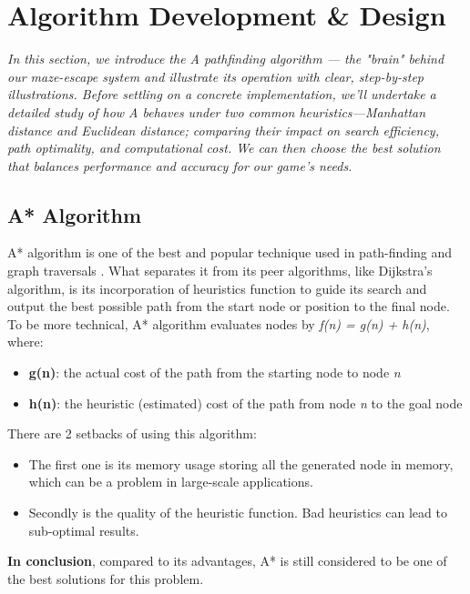 \documentclass[a4paper,12pt]{article}
\begin{document}
\newpage

\section{Algorithm Development \& Design}
\textit{In this section, we introduce the A\* pathfinding algorithm — the "brain" behind our maze-escape system and illustrate its operation with clear, step-by-step illustrations. Before settling on a concrete implementation, we’ll undertake a detailed study of how A\* behaves under two common heuristics—Manhattan distance and Euclidean distance; comparing their impact on search efficiency, path optimality, and computational cost. We can then choose the best solution that balances performance and accuracy for our game’s needs.}

\subsection{A* Algorithm}
A* algorithm is one of the best and popular technique used in path-finding and graph traversals \parencite{wiki:a-star,geeks:a-star}. What separates it from its peer algorithms, like Dijkstra's algorithm, is its incorporation of heuristics function to guide its search and output the best possible path from the start node or position to the final node.
To be more technical, A* algorithm evaluates nodes by \textit{f(n) = g(n) + h(n)}, where: 
\begin{itemize}
    \item \textbf{g(n)}: the actual cost of the path from the starting node to node \textit{n}
    \item \textbf{h(n)}: the heuristic (estimated) cost of the path from node \textit{n} to the goal node 
\end{itemize}
There are 2 setbacks of using this algorithm: 
\begin{itemize}
    \item The first one is its memory usage storing all the generated node in memory, which can be a problem in large-scale applications.
    \item Secondly is the quality of the heuristic function. Bad heuristics can lead to sub-optimal results.
\end{itemize}
\textbf{In conclusion}, compared to its advantages, A* is still considered to be one of the best solutions for this problem.
\vspace{1em}
\end{document}
